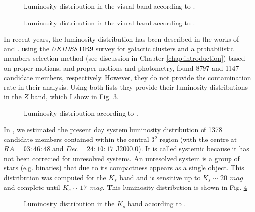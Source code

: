 \begin{figure}[htbp]
\begin{center}
\caption{Luminosity distribution in the visual band according to \citet{Johnson1958}.}
\label{fig:luminosityJohnson}
\end{center}
\end{figure}


\begin{figure}[htbp]
\begin{center}
\caption{Luminosity distribution in the visual band according to \citet{Limber1962}.}
\label{fig:luminosityLimber}
\end{center}
\end{figure}

In recent years, the luminosity distribution has been described in the works of \citet{Lodieu2012} and \citet{Bouy2015}. 
\citet{Lodieu2012} using the \emph{UKIDSS} DR9 survey for galactic clusters and a probabilistic members selection method (see discussion in Chapter \ref{chap:introduction}) based on proper motions, and proper motions and photometry, found 8797 and 1147 candidate members, respectively. However, they do not provide the contamination rate in their analysis. Using both lists they provide their luminosity distributions in the $Z$ band, which I show in Fig. \ref{fig:luminosityLodieu}.

\begin{figure}[htbp]
\begin{center}
\caption{Luminosity distribution according to \citet{Lodieu2012}.}
\label{fig:luminosityLodieu}
\end{center}
\end{figure}

In \citet{Bouy2015},  we estimated the present day system luminosity distribution of 1378 candidate members contained within the central $3^o$ region (with the centre at $RA=03:46:48$ and $Dec=24:10:17$ J2000.0). It is called systemic because it has not been corrected for unresolved systems. An unresolved system is a group of stars (e.g. binaries) that due to its compactness appears as a single object. This distribution was computed for the $K_s$ band and is sensitive up to $K_s \sim 20 \ \ mag$ and complete until $K_s \sim 17\ \ mag$. This luminosity distribution is shown in Fig. \ref{fig:luminosityBouy}


\begin{figure}[htbp]
\begin{center}
\caption{Luminosity distribution in the $K_s$ band according to \citet{Bouy2015}.}
\label{fig:luminosityBouy}
\end{center}
\end{figure}

